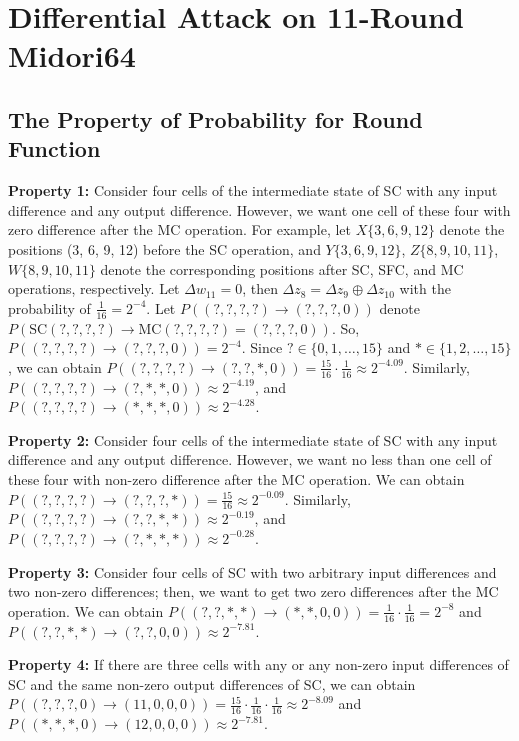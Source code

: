 \documentclass{article}
\begin{document}
\section{Differential Attack on 11-Round Midori64}

\subsection{The Property of Probability for Round Function}

\textbf{Property 1:} Consider four cells of the intermediate state of SC with any input difference and any output difference. However, we want one cell of these four with zero difference after the MC operation. For example, let $X\{3, 6, 9, 12\}$ denote the positions (3, 6, 9, 12) before the SC operation, and $Y\{3, 6, 9, 12\}$, $Z\{8, 9, 10, 11\}$, $W\{8, 9, 10, 11\}$ denote the corresponding positions after SC, SFC, and MC operations, respectively. Let $\Delta w_{11} = 0$, then $\Delta z_8 = \Delta z_9 \oplus \Delta z_{10}$ with the probability of $\frac{1}{16} = 2^{-4}$. Let $P((?, ?, ?, ?) \to (?, ?, ?, 0))$ denote $P(\text{SC}(?, ?, ?, ?) \to \text{MC}(?, ?, ?, ?) = (?, ?, ?, 0))$. So, $P((?, ?, ?, ?) \to (?, ?, ?, 0)) = 2^{-4}$. Since $? \in \{0, 1, \dots, 15\}$ and $\ast \in \{1, 2, \dots, 15\}$, we can obtain $P((?, ?, ?, ?) \to (?, ?, \ast, 0)) = \frac{15}{16} \cdot \frac{1}{16} \approx 2^{-4.09}$. Similarly, $P((?, ?, ?, ?) \to (?, \ast, \ast, 0)) \approx 2^{-4.19}$, and $P((?, ?, ?, ?) \to (\ast, \ast, \ast, 0)) \approx 2^{-4.28}$.

\textbf{Property 2:} Consider four cells of the intermediate state of SC with any input difference and any output difference. However, we want no less than one cell of these four with non-zero difference after the MC operation. We can obtain $P((?, ?, ?, ?) \to (?, ?, ?, \ast)) = \frac{15}{16} \approx 2^{-0.09}$. Similarly, $P((?, ?, ?, ?) \to (?, ?, \ast, \ast)) \approx 2^{-0.19}$, and $P((?, ?, ?, ?) \to (?, \ast, \ast, \ast)) \approx 2^{-0.28}$.

\textbf{Property 3:} Consider four cells of SC with two arbitrary input differences and two non-zero differences; then, we want to get two zero differences after the MC operation. We can obtain $P((?, ?, \ast, \ast) \to (\ast, \ast, 0, 0)) = \frac{1}{16} \cdot \frac{1}{16} = 2^{-8}$ and $P((?, ?, \ast, \ast) \to (?, ?, 0, 0)) \approx 2^{-7.81}$.

\textbf{Property 4:} If there are three cells with any or any non-zero input differences of SC and the same non-zero output differences of SC, we can obtain $P((?, ?, ?, 0) \to (11, 0, 0, 0)) = \frac{15}{16} \cdot \frac{1}{16} \cdot \frac{1}{16} \approx 2^{-8.09}$ and $P((\ast, \ast, \ast, 0) \to (12, 0, 0, 0)) \approx 2^{-7.81}$.
\end{document}
